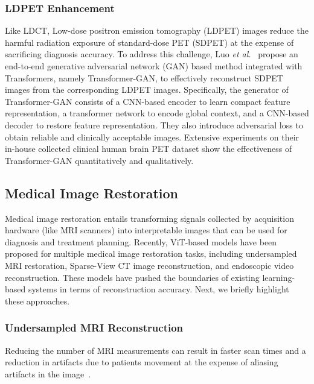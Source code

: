 \documentclass[10pt,journal,compsoc]{IEEEtran}
\begin{document}
\subsubsection{\textbf{LDPET Enhancement}} Like LDCT, Low-dose positron emission tomography (LDPET) images reduce the harmful radiation exposure of standard-dose PET (SDPET) at the expense of sacrificing diagnosis accuracy. 
To address this challenge, Luo \textit{et al.}~\cite{luo20213d} propose an end-to-end generative adversarial network (GAN) based method integrated with Transformers, namely Transformer-GAN, to effectively reconstruct SDPET images from the corresponding LDPET images. Specifically, the generator of Transformer-GAN consists of a CNN-based encoder to learn compact feature representation, a transformer network to encode global context, and a CNN-based decoder to restore feature representation. They also introduce adversarial loss to obtain reliable and clinically acceptable images. Extensive experiments on their in-house collected clinical human brain PET dataset show the effectiveness of Transformer-GAN quantitatively and qualitatively.



\subsection{Medical Image Restoration}
Medical image restoration entails transforming signals collected by acquisition hardware (like MRI scanners) into interpretable images that can be used for diagnosis and treatment planning. Recently, ViT-based models have been proposed for multiple medical image restoration tasks, including undersampled MRI restoration, Sparse-View CT image reconstruction, and endoscopic video reconstruction. These models have pushed the boundaries of existing learning-based systems in terms of reconstruction accuracy. Next, we briefly highlight these approaches. 

\subsubsection{\textbf{Undersampled MRI Reconstruction}} Reducing the number of MRI measurements can result in faster scan times and a reduction in artifacts due to patients movement at the expense of aliasing artifacts in the image~\cite{hyun2018deep}. %
\end{document}
